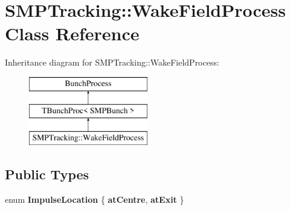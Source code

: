 \hypertarget{classSMPTracking_1_1WakeFieldProcess}{}\section{S\+M\+P\+Tracking\+:\+:Wake\+Field\+Process Class Reference}
\label{classSMPTracking_1_1WakeFieldProcess}
Inheritance diagram for S\+M\+P\+Tracking\+:\+:Wake\+Field\+Process\+:\begin{figure}[H]
\begin{center}
\leavevmode
\includegraphics[height=3.000000cm]{classSMPTracking_1_1WakeFieldProcess}
\end{center}
\end{figure}
\subsection*{Public Types}
\begin{DoxyCompactItemize}
\item 
\mbox{\label{classSMPTracking_1_1WakeFieldProcess_a6bb79d2caf1d3b1cc9dcc8f2a77cca2f}} 
enum {\bfseries Impulse\+Location} \{ {\bfseries at\+Centre}, 
{\bfseries at\+Exit}
 \}
\end{DoxyCompactItemize}
